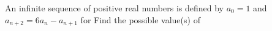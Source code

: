 An infinite sequence of positive real numbers is defined by $a_0=1$ and $a_{n+2}=6a_n-a_{n+1}$ for   Find the possible value(s) of 